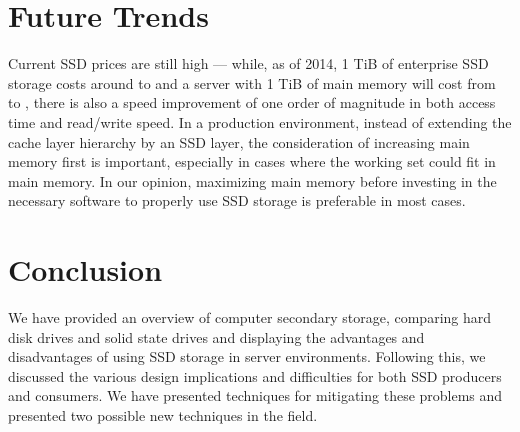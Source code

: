 \documentclass{acm_proc_article-sp}
\begin{document}
\section{Future Trends}
Current SSD prices are still high --- while, as of 2014, 1 TiB of enterprise SSD storage costs around  to  and a server with 1 TiB of main memory will cost from  to , there is also a speed improvement of one order of magnitude in both access time and read/write speed. In a production environment, instead of extending the cache layer hierarchy by an SSD layer, the consideration of increasing main memory first is important, especially in cases where the working set could fit in main memory. In our opinion, maximizing main memory before investing in the necessary software to properly use SSD storage is preferable in most cases.

\section{Conclusion}
We have provided an overview of computer secondary storage, comparing hard disk drives and solid state drives and displaying the advantages and disadvantages of using SSD storage in server environments.
Following this, we discussed the various design implications and difficulties for both SSD producers and consumers.
We have presented techniques for mitigating these problems and presented two possible new techniques in the field.




\balancecolumns
\end{document}
